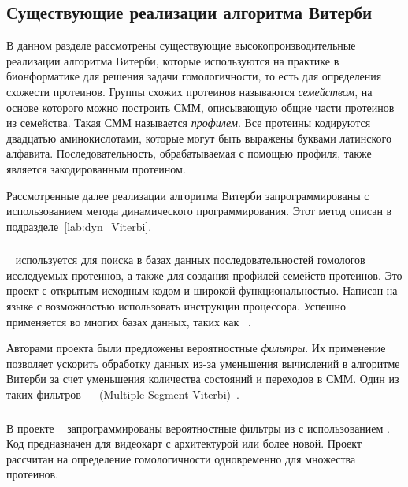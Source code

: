 \subsection{Существующие реализации алгоритма Витерби}
\label{lab:exist_Viterbi}
В данном разделе рассмотрены существующие 
высокопроизводительные реализации алгоритма Витерби, которые 
используются на практике в бионформатике для решения задачи 
гомологичности, то есть для определения схожести протеинов.
Группы схожих протеинов называются \emph{семейством},
на основе которого можно построить СММ, описывающую общие 
части протеинов из семейства.
Такая СММ называется \emph{профилем}.
Все протеины кодируются двадцатью аминокислотами, 
которые могут быть выражены буквами латинского алфавита.
Последовательность, обрабатываемая с помощью профиля, также 
является закодированным протеином.

Рассмотренные далее реализации алгоритма Витерби 
запрограммированы с использованием метода динамического 
программирования.
Этот метод описан в подразделе~\ref{lab:dyn_Viterbi}.

\subsubsection{}
~\cite{HMMer} используется для поиска в базах 
данных последовательностей гомологов исследуемых протеинов, а 
также для создания профилей семейств протеинов.
Это проект с открытым исходным кодом и широкой 
функциональностью.
Написан на языке  с возможностью использовать 
 инструкции процессора.
Успешно применяется во многих базах данных, таких как ~\cite{Pfam}.

Авторами проекта были предложены вероятностные \emph{фильтры}.
Их применение позволяет ускорить обработку данных из-за 
уменьшения вычислений в алгоритме Витерби за счет уменьшения 
количества состояний и переходов в СММ.
Один из таких фильтров ---  (Multiple Segment 
Viterbi)~\cite{MSV_Eddy}.

\subsubsection{}
В проекте ~\cite{cudampf} запрограммированы 
вероятностные фильтры из  с использованием 
.
Код предназначен для видеокарт  с 
архитектурой  или более новой.
Проект рассчитан на определение гомологичности одновременно 
для множества протеинов.

